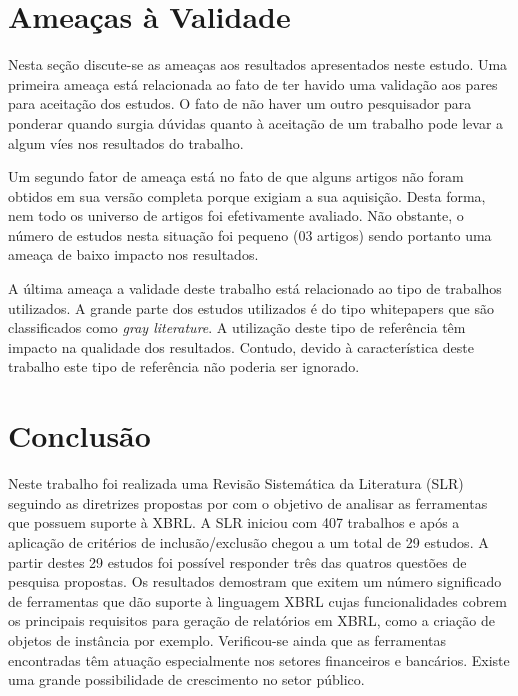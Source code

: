\documentclass[12pt]{article}
\begin{document}
\section{Ameaças à Validade}
\label{sec:ameacas}
Nesta seção discute-se as ameaças aos resultados apresentados neste estudo. Uma
primeira ameaça está relacionada ao fato de ter havido uma validação aos pares
para aceitação dos estudos. O fato de não haver um outro pesquisador para
ponderar quando surgia dúvidas quanto à aceitação de um trabalho pode levar a
algum víes nos resultados do trabalho.

Um segundo fator de ameaça está no fato de que alguns artigos não foram obtidos em sua versão completa porque exigiam a
sua aquisição. Desta forma, nem todo os universo de artigos foi efetivamente
avaliado. Não obstante, o número de estudos nesta situação foi pequeno (03
artigos) sendo portanto uma ameaça de baixo impacto nos resultados.

A última ameaça a validade deste trabalho está relacionado ao tipo de trabalhos
utilizados. A grande parte dos estudos utilizados é do tipo whitepapers que são
classificados como \textit{gray literature}. A utilização deste tipo de
referência têm impacto na qualidade dos resultados. Contudo, devido à
característica deste trabalho este tipo de referência não poderia ser
ignorado.

\section{Conclusão}
\label{sec:conclusao}

Neste trabalho foi realizada uma Revisão Sistemática da Literatura (SLR) seguindo as
diretrizes propostas por \cite{keele2007guidelines} com o objetivo de analisar
as ferramentas que possuem suporte à XBRL. A SLR iniciou com 407 trabalhos e
após a aplicação de critérios de inclusão/exclusão chegou a um total de 29
estudos. A partir destes 29 estudos foi possível responder três das quatros
questões de pesquisa propostas. Os resultados demostram que exitem um número
significado de ferramentas que dão suporte à linguagem XBRL cujas
funcionalidades cobrem os principais requisitos para geração de relatórios em
XBRL, como a criação de objetos de instância por exemplo. Verificou-se ainda
que as ferramentas encontradas têm atuação especialmente nos setores
financeiros e bancários. Existe uma grande possibilidade de crescimento no
setor público.




\end{document}
